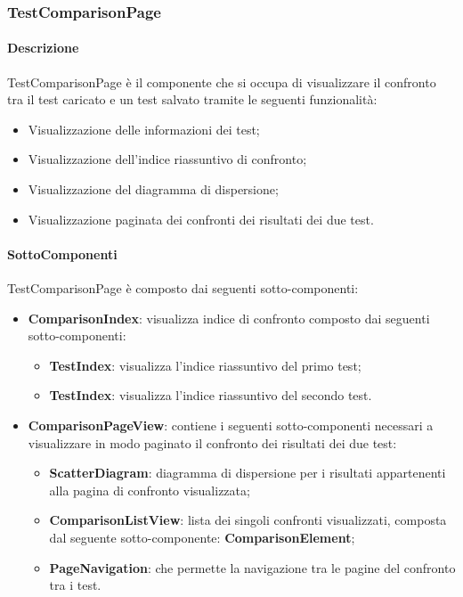 \subsubsection{TestComparisonPage} 
\label{sec:TestComparisonPage}
\paragraph{Descrizione}
TestComparisonPage è il componente che si occupa di visualizzare il confronto tra il test caricato e un test salvato tramite le seguenti funzionalità:
\begin{itemize}
    \item Visualizzazione delle informazioni dei test;
    \item Visualizzazione dell'indice riassuntivo di confronto;
    \item Visualizzazione del diagramma di dispersione;
    \item Visualizzazione paginata dei confronti dei risultati dei due test.
\end{itemize} 
\paragraph{SottoComponenti}
TestComparisonPage è composto dai seguenti sotto-componenti:
\begin{itemize}
    \item \textbf{ComparisonIndex}: visualizza indice di confronto composto dai seguenti sotto-componenti:
    \begin{itemize}
        \item \textbf{TestIndex}: visualizza l'indice riassuntivo del primo test;
        \item \textbf{TestIndex}: visualizza l'indice riassuntivo del secondo test.
    \end{itemize}
    
    \item \textbf{ComparisonPageView}: contiene i seguenti sotto-componenti necessari a visualizzare in modo paginato il confronto dei risultati dei due test:
    \begin{itemize}
        \item \textbf{ScatterDiagram}: diagramma di dispersione per i risultati appartenenti alla pagina di confronto visualizzata;
        
        \item \textbf{ComparisonListView}: lista dei singoli confronti visualizzati, composta dal seguente sotto-componente: \textbf{ComparisonElement};
        
        \item \textbf{PageNavigation}: che permette la navigazione tra le pagine del confronto tra i test.
    \end{itemize}
\end{itemize}

